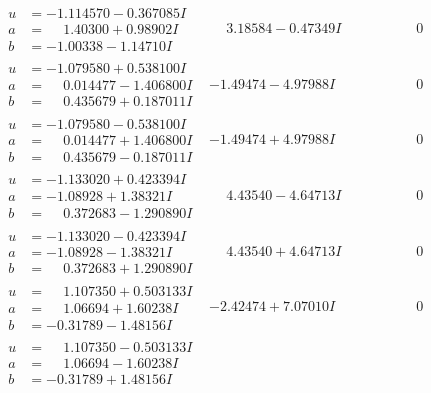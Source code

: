 \documentclass[1p]{elsarticle_modified}
\theoremstyle{definition}
\begin{document}
$$\begin{array}{c|c|c}
\begin{aligned}
u &= -1.114570 - 0.367085 I \\
a &= \phantom{-}1.40300 + 0.98902 I \\
b &= -1.00338 - 1.14710 I\end{aligned}
 & \phantom{-}3.18584 - 0.47349 I & \phantom{-0.000000 } 0 \\ \hline\begin{aligned}
u &= -1.079580 + 0.538100 I \\
a &= \phantom{-}0.014477 - 1.406800 I \\
b &= \phantom{-}0.435679 + 0.187011 I\end{aligned}
 & -1.49474 - 4.97988 I & \phantom{-0.000000 } 0 \\ \hline\begin{aligned}
u &= -1.079580 - 0.538100 I \\
a &= \phantom{-}0.014477 + 1.406800 I \\
b &= \phantom{-}0.435679 - 0.187011 I\end{aligned}
 & -1.49474 + 4.97988 I & \phantom{-0.000000 } 0 \\ \hline\begin{aligned}
u &= -1.133020 + 0.423394 I \\
a &= -1.08928 + 1.38321 I \\
b &= \phantom{-}0.372683 - 1.290890 I\end{aligned}
 & \phantom{-}4.43540 - 4.64713 I & \phantom{-0.000000 } 0 \\ \hline\begin{aligned}
u &= -1.133020 - 0.423394 I \\
a &= -1.08928 - 1.38321 I \\
b &= \phantom{-}0.372683 + 1.290890 I\end{aligned}
 & \phantom{-}4.43540 + 4.64713 I & \phantom{-0.000000 } 0 \\ \hline\begin{aligned}
u &= \phantom{-}1.107350 + 0.503133 I \\
a &= \phantom{-}1.06694 + 1.60238 I \\
b &= -0.31789 - 1.48156 I\end{aligned}
 & -2.42474 + 7.07010 I & \phantom{-0.000000 } 0 \\ \hline\begin{aligned}
u &= \phantom{-}1.107350 - 0.503133 I \\
a &= \phantom{-}1.06694 - 1.60238 I \\
b &= -0.31789 + 1.48156 I\end{aligned}

\end{array}$$
\end{document}
